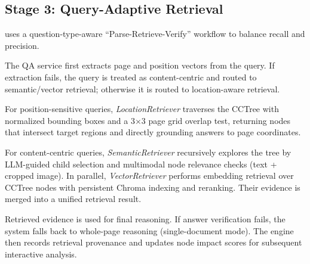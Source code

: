 \subsection{Stage 3: Query-Adaptive Retrieval}
\modora uses a question-type-aware ``Parse-Retrieve-Verify'' workflow to balance recall and precision.

 The QA service first extracts page and position vectors from the query. If extraction fails, the query is treated as content-centric and routed to semantic/vector retrieval; otherwise it is routed to location-aware retrieval.

 For position-sensitive queries, \textit{LocationRetriever} traverses the CCTree with normalized bounding boxes and a 3$\times$3 page grid overlap test, returning nodes that intersect target regions and directly grounding answers to page coordinates.

 For content-centric queries, \textit{SemanticRetriever} recursively explores the tree by LLM-guided child selection and multimodal node relevance checks (text + cropped image). In parallel, \textit{VectorRetriever} performs embedding retrieval over CCTree nodes with persistent Chroma indexing and reranking. Their evidence is merged into a unified retrieval result.

 Retrieved evidence is used for final reasoning. If answer verification fails, the system falls back to whole-page reasoning (single-document mode). The engine then records retrieval provenance and updates node impact scores for subsequent interactive analysis.
